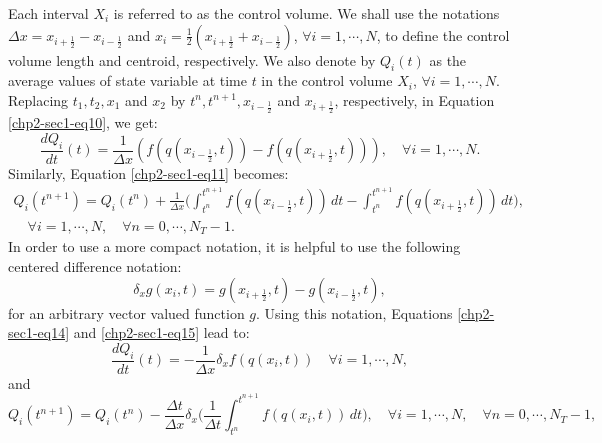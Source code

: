 Each interval $X_i$ is referred to as the control volume. 
We shall use the notations $\Delta x = x_{i+\frac{1}{2}} - x_{i-\frac{1}{2}}$ 
and $x_i = \frac{1}{2}(x_{i+\frac{1}{2}} + x_{i-\frac{1}{2}})$, $\forall i = 1, \cdots, N$, 
to define the control volume length and centroid, respectively.
We also denote by ${Q}_i(t)$ as the
average values of state variable at time $t$
in the control volume $X_i$, $\forall i = 1, \cdots, N$. Replacing $t_1, t_2, x_1$ and 
$x_2$ by $t^{n}, t^{n+1}, x_{i-\frac{1}{2}}$ and $x_{i+\frac{1}{2}}$,
respectively, in Equation \eqref{chp2-sec1-eq10}, we get:
\begin{equation}
	\label{chp2-sec1-eq14}
	\frac{dQ_i}{dt} (t) = \frac{1}{\Delta x}
	({f}({q}(x_{i-\frac{1}{2}},t)) -
	{f}({q}(x_{i+\frac{1}{2}},t))) ,
	\quad \forall i = 1, \cdots, N.
\end{equation}
Similarly, Equation \eqref{chp2-sec1-eq11} becomes:
\begin{equation}
        \label{chp2-sec1-eq15}
	\begin{aligned}
		{Q}_i(t^{n+1}) =  {Q}_i(t^{n}) +
		\frac{1}{\Delta x}\bigg( \int_{t^{n}}^{t^{n+1}}
        	{f}({q}(x_{i-\frac{1}{2}}, t)) \,dt -
		\int_{t^{n}}^{t^{n+1}}{f}({q}(x_{i+\frac{1}{2}}, t)) \,dt \bigg),
       		\\
		\quad \forall i = 1, \cdots, N,
		\quad \forall n = 0, \cdots, N_T-1.
	\end{aligned}
\end{equation}
In order to use a more compact notation, it is helpful to use the following centered difference notation:
\begin{equation}
	\label{chp2-sec1-eq16}
	\delta_x {g}(x_i,t) = 
	{g}(x_{i+\frac{1}{2}},t) - 
	{g}(x_{i-\frac{1}{2}},t),
\end{equation}
for an arbitrary vector valued function ${g}$. 
Using this notation, Equations \eqref{chp2-sec1-eq14}
and \eqref{chp2-sec1-eq15} lead to:
\begin{equation}
        \label{chp2-sec1-eq17}
        \frac{dQ_i}{dt}(t) = -\frac{1}{\Delta x}
	\delta_x {f}({q}(x_{i},t))
        \quad \forall i = 1, \cdots, N,
\end{equation}
and
\begin{equation}
        \label{chp2-sec1-eq18}
        {Q}_i(t^{n+1}) =  {Q}_i(t^{n}) -
	\frac{\Delta t}{  \Delta x} \delta _x\bigg( \frac{1}{\Delta t}\int_{t^{n}}^{t^{n+1}}
        {f}({q}(x_{i}, t)) \,dt \bigg),
        \quad \forall i = 1, \cdots, N,
        \quad \forall n = 0, \cdots, N_T-1,
\end{equation}
